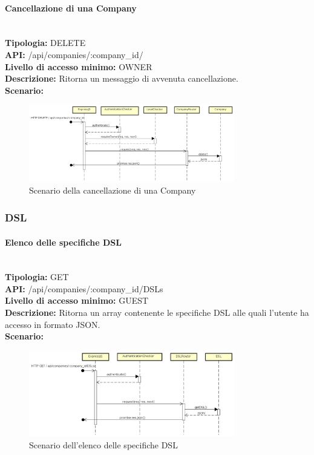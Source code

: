 \newpage
\paragraph{Cancellazione di una Company}\mbox{}\\
\textbf{Tipologia:} DELETE \\
\textbf{API:} /api/companies/:company\_id/ \\
\textbf{Livello di accesso minimo:} OWNER \\
\textbf{Descrizione:} Ritorna un messaggio di avvenuta cancellazione. \\
\textbf{Scenario:} 
\begin{figure}[H]
\centering
\includegraphics[width=0.8\textwidth]{res/sections/backend/sequence/(DELETE)company.png}
\caption{Scenario della cancellazione di una Company}
\end{figure}

\newpage
\subsubsection{DSL}
\paragraph{Elenco delle specifiche DSL}\mbox{}\\
\textbf{Tipologia:} GET \\
\textbf{API:} /api/companies/:company\_id/DSLs \\
\textbf{Livello di accesso minimo:} GUEST \\
\textbf{Descrizione:} Ritorna un array contenente le specifiche DSL alle quali l'utente ha accesso in formato JSON. \\
\textbf{Scenario:} 
\begin{figure}[H]
\centering
\includegraphics[width=0.8\textwidth]{res/sections/backend/sequence/(GET)dsl.png}
\caption{Scenario dell'elenco delle specifiche DSL}
\end{figure}

